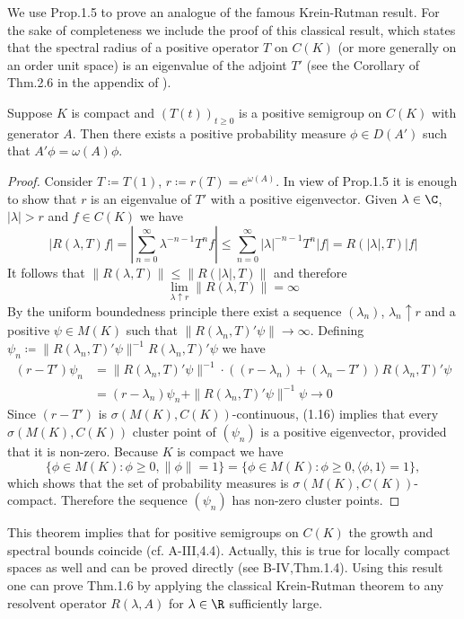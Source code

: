 We use Prop.1.5 to prove an analogue of the famous Krein-Rutman result.
For the sake of completeness we include the proof of this classical result, which states that the spectral radius of a positive operator $T$ on $C(K)$ (or more generally on an order unit space) is an eigenvalue of the adjoint $T'$ (see the Corollary of Thm.2.6 in the appendix of \citet{schaefer:1966}).
\begin{theorem}\label{thm:b3-1.6}
	Suppose $K$ is compact and $(T(t))_{t \geq 0}$ is a positive semigroup on $C(K)$ with generator $A$.
	Then there exists a positive probability measure $\phi \in D(A')$ such that $A'\phi = \omega(A)\phi$.
\end{theorem}
\begin{proof}
	Consider $T \coloneqq T(1)$, $r \coloneqq r(T) = e^{\omega(A)}$.
	In view of Prop.1.5 it is enough to show that $r$ is an eigenvalue of $T'$ with a positive eigenvector.
	Given $\lambda \in \C$, $|\lambda| > r$ and $f \in C(K)$ we have
	\[
	|R(\lambda,T)f| = |\sum_{n=0}^{\infty} \lambda^{-n-1} T^{n}f| \leq \sum_{n=0}^{\infty} |\lambda|^{-n-1} T^{n}|f| = R(|\lambda|,T) |f|
	\]
	It follows that $\|R(\lambda,T)\| \leq \|R(|\lambda|,T)\|$ and therefore
	\begin{equation}\label{eq:b3-1.15}
		\lim_{\lambda \uparrow r}\|R(\lambda,T)\| = \infty
	\end{equation}
	By the uniform boundedness principle there exist a sequence $(\lambda_{n})$, $\lambda_{n} \uparrow r$ and a positive $\psi \in M(K)$ such that $\|R(\lambda_{n},T)'\psi\| \to \infty$.
	Defining $\psi_{n} \coloneqq \|R(\lambda_{n},T)'\psi\|^{-1}R(\lambda_{n},T)'\psi$ we have
%
%		
	\begin{equation}\label{eq:b3-1.16}
		\begin{split}
		(r - T')\psi_{n} & = \|R(\lambda_{n},T)'\psi\|^{-1}\cdot((r-\lambda_{n}) + (\lambda_{n} - T'))R(\lambda_{n},T)'\psi\\ 
		& = (r-\lambda_{n})\psi_{n} + \|R(\lambda_{n},T)'\psi\|^{-1}\psi \to 0
		\end{split}
	\end{equation}
	Since $(r - T')$ is $\sigma(M(K),C(K))$-continuous, (1.16) implies that every $\sigma(M(K),C(K))$ cluster point of $(\psi_{n})$ is a positive eigenvector, provided that it is non-zero.
	Because $K$ is compact we have 
%
\[
	\{\phi \in M(K) \colon \phi \geq 0, \|\phi\| = 1\} 
	= \{\phi \in M(K) \colon \phi \geq 0, \langle \phi,1 \rangle = 1\} , 
\]
which shows that the set of probability measures is $\sigma(M(K),C(K))$-compact.
	Therefore the sequence $(\psi_{n})$ has non-zero cluster points.
\end{proof}
This theorem implies that for positive semigroups on $C(K)$ the growth and spectral bounds coincide (cf. A-III,4.4).
Actually, this is true for locally compact spaces as well and can be proved directly (see B-IV,Thm.1.4).
Using this result one can prove Thm.1.6 by applying the classical Krein-Rutman theorem to any resolvent operator $R(\lambda,A)$ for $\lambda \in \R$ sufficiently large.

